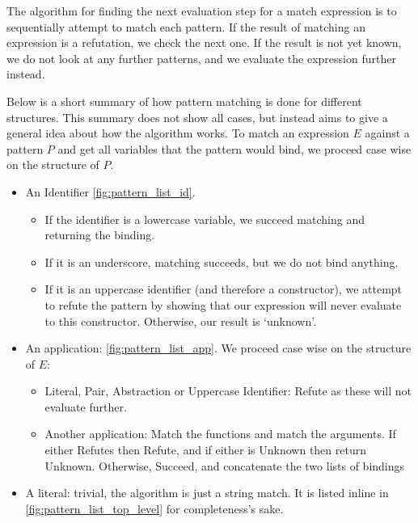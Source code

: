 The algorithm for finding the next evaluation step for a match expression is to sequentially attempt to match each pattern. If the result of matching an expression is a refutation, we check the next one. If the result is not yet known, we do not look at any further patterns, and we evaluate the expression further instead. 

Below is a short summary of how pattern matching is done for different structures. This summary does not show all cases, but instead aims to give a general idea about how the algorithm works. To match an expression $E$ against a pattern $P$ and get all variables that the pattern would bind, we proceed case wise on the structure of $P$. 
\begin{itemize}
    \item An Identifier \ref{fig:pattern_list_id}. 
    \begin{itemize}
        \item If the identifier is a lowercase variable, we succeed matching and returning the binding.
        \item If it is an underscore, matching succeeds, but we do not bind anything. 
        \item If it is an uppercase identifier (and therefore a constructor), we attempt to refute the pattern by showing that our expression will never evaluate to this constructor. Otherwise, our result is `unknown'.
    \end{itemize}

    
    \item An application: \ref{fig:pattern_list_app}. We proceed case wise on the structure of $E$:
    \begin{itemize}
        \item Literal, Pair, Abstraction or Uppercase Identifier: Refute as these will not evaluate further.
        \item Another application: Match the functions and match the arguments. If either Refutes then Refute, and if either is Unknown then return Unknown. Otherwise, Succeed, and concatenate the two lists of bindings
    \end{itemize} 

    \item A literal: trivial, the algorithm is just a string match. It is listed inline in \ref{fig:pattern_list_top_level} for completeness's sake. 
\end{itemize}

